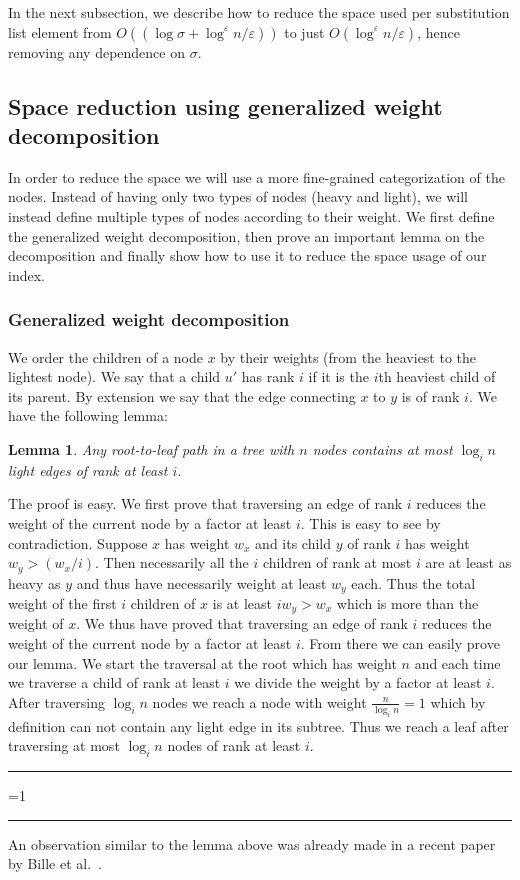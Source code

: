 \documentclass{article}
\newcommand{\?}{\mskip1.5mu}
\renewcommand{\epsilon}{\varepsilon}
\newtheorem{lemma}{Lemma}
\newcounter{noqed}
\newcommand{\qed}{ \ifmmode\mbox{
}\fi\rule[-.05em]{.3em}{.7em}\setcounter{noqed}{0}}
\newenvironment{proof}[1][{}]{\noindent{\bf Proof#1.
}\setcounter{noqed}{1}}{\ifnum\value{noqed}=1\qed\fi\par\medskip}
\begin{document}
In the next subsection, we describe how to reduce the space used per substitution list element from $O((\log\sigma+\log^\epsilon n/\epsilon))$ to just $O(\log^\epsilon n/\epsilon)$, hence removing any dependence on $\sigma$. 



\subsection{Space reduction using generalized weight decomposition}
\label{section:gen_weight_decomp}
In order to reduce the space we will use a more fine-grained categorization of the nodes. Instead of having only two types of nodes (heavy and light), we will instead define multiple types of nodes according to their weight. We first define the generalized weight decomposition, then prove an important lemma on the decomposition and finally show how to use it to reduce the space usage of our index. 
\subsubsection{Generalized weight decomposition}
We order the children of a node $x$ by their weights (from the heaviest to the lightest node). We say that a child $u'$ has rank $i$ if it is the $i$th heaviest child of its parent. By extension we say that the edge connecting $x$ to $y$ is of rank $i$. 
We have the following lemma:
\begin{lemma}
\label{lemma:heav_tree_lemma}
Any root-to-leaf path in a tree with $n$ nodes contains at most $\log_i n$ light edges of rank at least $i$.
\end{lemma}
\begin{proof}
The proof is easy. We first prove that traversing an edge of rank $i$ reduces the weight of the current node by a factor at least $i$. This is easy to see by contradiction. Suppose $x$ has weight $w_x$ and its child $y$ of rank $i$ has weight $w_y>(w_x/i)$. Then necessarily all the $i$ children of rank at most $i$ are at least as heavy as $y$ and thus have necessarily weight at least $w_y$ each. 
Thus the total weight of the first $i$ children of $x$ is at least $iw_y>w_x$ which is more than the weight of $x$. 
We thus have proved that traversing an edge of rank $i$ reduces the weight of the current node by a factor at least $i$. 
From there we can easily prove our lemma. We start the traversal at the root which has weight $n$ and each time we traverse a child of rank at least $i$ we divide the weight by a factor at least $i$. After traversing $\log_i n$ nodes we reach a node with weight $\frac{n}{\log_in}=1$ which by definition can not contain any light edge in its subtree. Thus we reach a leaf after traversing at most $\log_i n$ nodes of rank at least $i$. 
\qed
\end{proof}
An observation similar to the lemma above was already made in a recent paper by Bille et al.~\cite{BGSV12}. 
\end{document}
